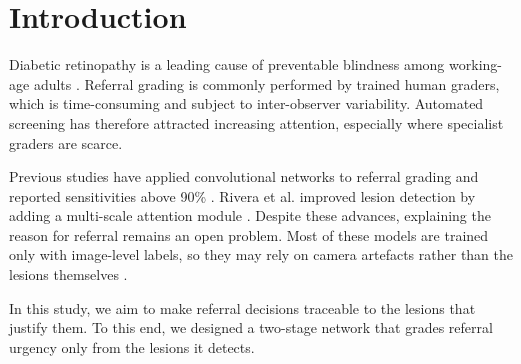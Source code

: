 \section{Introduction}

Diabetic retinopathy is a leading cause of preventable blindness among working-age adults \citep{morgan2021burden}.
Referral grading is commonly performed by trained human graders, which is time-consuming and subject to inter-observer variability.
Automated screening has therefore attracted increasing attention, especially where specialist graders are scarce.

Previous studies have applied convolutional networks to referral grading and reported sensitivities above 90\% \citep{example2022deep}.
Rivera et al. improved lesion detection by adding a multi-scale attention module \citep{rivera2023attention}.
Despite these advances, explaining the reason for referral remains an open problem.
Most of these models are trained only with image-level labels, so they may rely on camera artefacts rather than the lesions themselves \citep{sample2024shortcut}.

In this study, we aim to make referral decisions traceable to the lesions that justify them.
To this end, we designed a two-stage network that grades referral urgency only from the lesions it detects.
